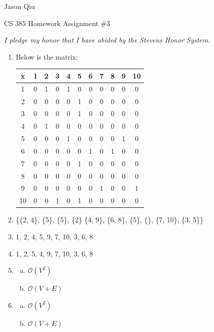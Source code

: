 \documentclass[a4paper,10pt]{article}
\begin{document}
Jason Qiu

CS 385 Homework Assignment $\#3$

\emph{I pledge my honor that I have abided by the Stevens Honor System.}
\begin{enumerate}
\item Below is the matrix:

\begin{tabular}{|c||c|c|c|c|c|c|c|c|c|c|}
	\hline
	x & 1 & 2 & 3 & 4 & 5 & 6 & 7 & 8 & 9 & 10\\
	\hline
	\hline
	1 & 0 & 1 & 0 & 1 & 0 & 0 & 0 & 0 & 0 & 0\\
	\hline
	2 & 0 & 0 & 0 & 0 & 1 & 0 & 0 & 0 & 0 & 0\\
	\hline
	3 & 0 & 0 & 0 & 0 & 1 & 0 & 0 & 0 & 0 & 0\\
	\hline
	4 & 0 & 1 & 0 & 0 & 0 & 0 & 0 & 0 & 0 & 0\\
	\hline
	5 & 0 & 0 & 0 & 1 & 0 & 0 & 0 & 0 & 1 & 0\\
	\hline
	6 & 0 & 0 & 0 & 0 & 0 & 1 & 0 & 1 & 0 & 0\\
	\hline
	7 & 0 & 0 & 0 & 0 & 1 & 0 & 0 & 0 & 0 & 0\\
	\hline
	8 & 0 & 0 & 0 & 0 & 0 & 0 & 0 & 0 & 0 & 0\\
	\hline
	9 & 0 & 0 & 0 & 0 & 0 & 0 & 1 & 0 & 0 & 1\\
	\hline
	10 & 0 & 0 & 1 & 0 & 1 & 0 & 0 & 0 & 0 & 0\\
	\hline
	\end{tabular}
\item \{\{2, 4\}, \{5\}, \{5\}, \{2\} \{4, 9\}, \{6, 8\}, \{5\}, \{\}, \{7, 10\}, \{3, 5\}\}

\item 1, 2, 4, 5, 9, 7, 10, 3, 6, 8

\item 1, 2, 5, 4, 9, 7, 10, 3, 6, 8

\item \begin{enumerate}[(a)]
	\item $\mathcal{O} (V^2)$

	\item $\mathcal{O} (V+E)$
\end{enumerate}

\item \begin{enumerate}[(a)]
	\item $\mathcal{O} (V^2)$

	\item $\mathcal{O} (V+E)$
\end{enumerate}



\end{enumerate}
\end{document}
